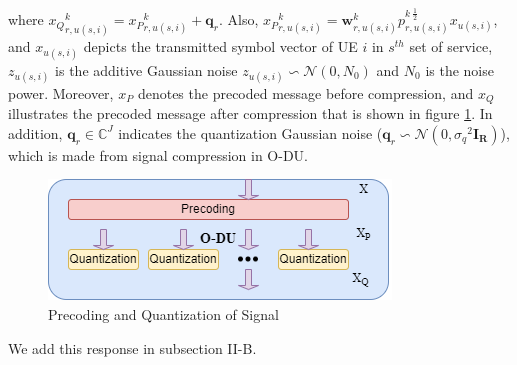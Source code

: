 \documentclass[12pt, letterpaper]{article}
\begin{document}
where ${x_Q}^k_{r,u(s,i)} ={x_P}^k_{r,u(s,i)}+ \boldsymbol{q}_{r}$. Also, ${x_P}^k_{r,u(s,i)}= \boldsymbol{w}^k_{r,u(s,i)}{p^{k \: \frac{1}{2}}_{r,u(s,i)}} x_{u(s,i)} $, and  $ x_{u(s,i)}$ depicts the transmitted symbol vector of UE $i$ in $s^{th}$ set of service,  $z_{u(s,i)}$ is the additive Gaussian noise $z_{u(s,i)} \backsim \mathcal{N}(0,N_0)$ and $N_0$ is the noise power.
Moreover, ${x_P}$ denotes the precoded message before compression, and ${x_Q}$ illustrates the precoded message after compression that is shown in figure \ref{fig:pq}.
In addition, $\boldsymbol{q}_{r} \in \mathbb{C}^{J }  $ indicates the quantization Gaussian noise
($\boldsymbol{q}_{r} \backsim \mathcal{N}(0,{\sigma_q}^2\boldsymbol{I_{R}} )$), which is made from signal compression in O-DU.
\begin{figure}
  \centering
  \captionsetup{justification=centering}
    \includegraphics[scale = 0.7]{Qdiag.png}
  \caption{Precoding and Quantization of Signal}
  \label{fig:pq}
\end{figure}

We add this response in subsection II-B.
\end{document}
